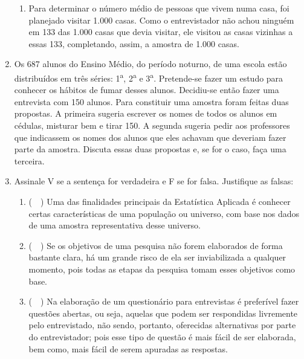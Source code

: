 \begin{enumerate}[label=\emph{\arabic*})]
\begin{enumerate}[label=\emph{\alph*})]
		      \item Para determinar o número médio de pessoas que vivem numa casa, foi planejado
		            visitar 1.000 casas. Como o entrevistador não achou ninguém em 133 das 1.000
		            casas que devia visitar, ele visitou as casas vizinhas a essas 133, completando,
		            assim, a amostra de 1.000 casas.

	      \end{enumerate}

	\item Os 687 alunos do Ensino Médio, do período noturno, de uma escola estão distribuídos
	      em três séries: 1\textsuperscript{a}, 2\textsuperscript{a} e 3\textsuperscript{a}. Pretende-se fazer um estudo para conhecer os hábitos de fumar
	      desses alunos. Decidiu-se então fazer uma entrevista com 150 alunos. Para constituir uma
	      amostra foram feitas duas propostas. A primeira sugeria escrever os nomes de todos os
	      alunos em cédulas, misturar bem e tirar 150. A segunda sugeria pedir aos professores que
	      indicassem os nomes dos alunos que eles achavam que deveriam fazer parte da amostra.
	      Discuta essas duas propostas e, se for o caso, faça uma terceira.

	\item Assinale V se a sentença for verdadeira e F se for falsa. Justifique as falsas:

	      \begin{enumerate}[label=\emph{\alph*})]


		      \item (~~) Uma das finalidades principais da Estatística Aplicada é conhecer certas
		            características de uma população ou universo, com base nos dados de uma amostra
		            representativa desse universo.


		      \item (~~) Se os objetivos de uma pesquisa não forem elaborados de forma bastante clara, há
		            um grande risco de ela ser inviabilizada a qualquer momento, pois todas as etapas
		            da pesquisa tomam esses objetivos como base.

		      \item (~~) Na elaboração de um questionário para entrevistas é preferível fazer questões abertas,
		            ou seja, aquelas que podem ser respondidas livremente pelo entrevistado, não sendo,
		            portanto, oferecidas alternativas por parte do entrevistador; pois esse tipo de questão é
		            mais fácil de ser elaborada, bem como, mais fácil de serem apuradas as respostas.


\end{enumerate}
\end{enumerate}
